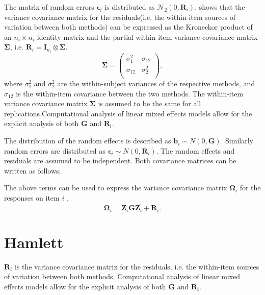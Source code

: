 \documentclass[12pt, a4paper]{report}
\theoremstyle{plain}
\theoremstyle{definition}
\theoremstyle{remark}
\begin{document}
The matrix of random errors $\boldsymbol{\epsilon}_i$ is distributed as $\mathcal{N}_2(0,\boldsymbol{R}_i)$.
\citet{hamlett} shows that the variance covariance matrix for the residuals(i.e. the within-item sources of variation between both methods) can be expressed as the Kroneckor product of an $n_i \times n_i$ identity matrix and the partial within-item variance covariance matrix $\boldsymbol{\Sigma}$, i.e. $\boldsymbol{R}_{i} = \boldsymbol{I}_{n_{i}} \otimes \boldsymbol{\Sigma}$.
\[
\boldsymbol{\Sigma} = \left( \begin{array}{cc}
\sigma^2_{1} & \sigma_{12} \\
\sigma_{12} & \sigma^2_{2} \\
\end{array}\right),
\]
where $\sigma^2_{1}$ and $\sigma^2_{2}$ are the within-subject variances of the respective methods, and $\sigma_{12}$ is the within-item covariance between the two methods. The within-item variance covariance matrix $\boldsymbol{\Sigma}$ is assumed to be the same for all replications.Computational analysis of linear mixed effects models allow for the explicit analysis of both $\boldsymbol{G}$ and $\boldsymbol{R_i}$.


The distribution of the random effects is described as $\boldsymbol{b}_i \sim N(0,\boldsymbol{G})$. Similarly  random errors are distributed as $\boldsymbol{\epsilon}_i \sim N(0,\boldsymbol{R}_i)$. The random effects and residuals are assumed to be independent. Both covariance matrices can be written as follows;






\bigskip
The above terms can be used to express the  variance covariance matrix $\boldsymbol{\Omega}_i$ for the responses on item $i$ ,
\[
\boldsymbol{\Omega}_i = \boldsymbol{Z}_i \boldsymbol{G} \boldsymbol{Z}_i^{\prime} + \boldsymbol{R}_i.
\]






\section{Hamlett}

$\boldsymbol{R}_{i}$ is the variance covariance matrix for the residuals, i.e. the within-item sources of variation between both methods. Computational analysis of linear mixed effects models allow for the explicit analysis of both $\boldsymbol{G}$ and $\boldsymbol{R_i}$.
\end{document}
